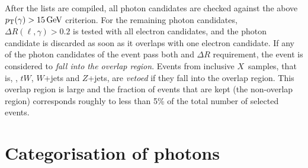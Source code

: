 %
After the lists are compiled, all photon candidates are checked against the above $\pT(\gamma) > \SI{15}{\GeV}$ criterion.
For the remaining photon candidates, $\Delta R(\ell,\gamma) > 0.2$ is tested with all electron candidates, and the photon candidate is discarded as soon as it overlaps with one electron candidate.
If any of the photon candidates of the event pass both \pT and $\Delta R$ requirement, the event is considered to \emph{fall into the overlap region}.
Events from inclusive $X$~samples, that is, \ttbar, $tW$, $W$+jets and $Z$+jets, are \emph{vetoed} if they fall into the overlap region. This overlap region is large and the fraction of events that are kept (the non-overlap region) corresponds roughly to less than 5\% of the total number of selected events.%



\section{Categorisation of photons}
\label{sec:photon-categorisation}

